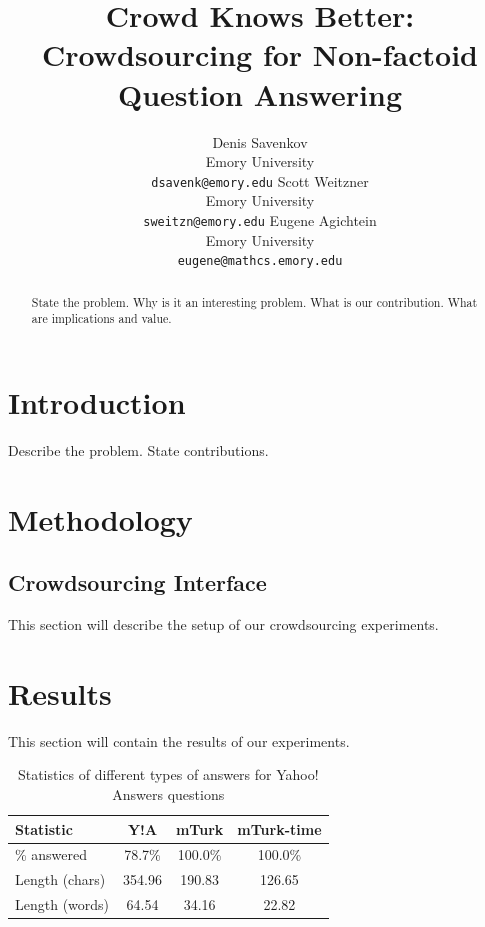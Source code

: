 \documentclass[11pt,letterpaper]{article}
\title{Crowd Knows Better: Crowdsourcing for Non-factoid Question Answering}
\author{Denis Savenkov \\ Emory University \\ {\tt dsavenk@emory.edu} 
  \And Scott Weitzner \\ Emory University \\ {\tt sweitzn@emory.edu}
  \And Eugene Agichtein \\ Emory University \\ {\tt eugene@mathcs.emory.edu}
}
\date{}
\begin{document}
\maketitle

\begin{abstract}
State the problem.
Why is it an interesting problem.
What is our contribution.
What are implications and value.
\end{abstract}

\section{Introduction}
\label{sec:introduction}

Describe the problem.
State contributions.


\section{Methodology}
\label{sec:methodology}

\subsection{Crowdsourcing Interface}
\label{subsec:interface}



This section will describe the setup of our crowdsourcing experiments.




\section{Results}
\label{sec:results}

This section will contain the results of our experiments.

\begin{table}[h]
\centering
\caption{Statistics of different types of answers for Yahoo! Answers questions}
\begin{tabular}{| p{2.3cm} | c | c | c |}
\hline
Statistic & Y!A & mTurk & mTurk-time\\
\hline
\% answered & 78.7\% & 100.0\% & 100.0\% \\
Length (chars) & 354.96 & 190.83 & 126.65 \\
Length (words) & 64.54 & 34.16 & 22.82 \\
\hline
\end{tabular}
\label{table:answer_stats}
\end{table}
\end{document}
